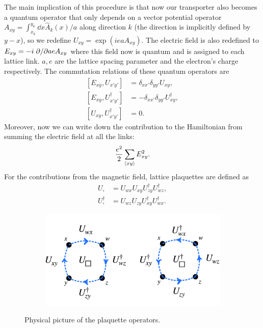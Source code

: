 \documentclass[a4paper]{report}
\begin{document}
\begin{spacing}{1.1}
The main implication of this procedure is that now our transporter also becomes a quantum operator that only depends on a vector potential operator ${A}_{xy} = \int_{x_k}^{y_k}\dd x \hat{A}_k(x)/a$ along direction $k$ (the direction is implicitly defined by $y-x$), so we redefine $U_{xy} = \exp( iea A_{xy} )$. The electric field is also redefined to $E_{xy} = -i \pdv*{aeA_{xy}}$ where this field now is quantum and is assigned to each lattice link. $a,e$ are the lattice spacing parameter and the electron's charge respectively. The commutation relations of these quantum operators are
\begin{align} 
    \left[ E_{xy}, U_{x'y'} \right] &= \delta_{xx'}\delta_{yy'}U_{xy}, \label{eq:comEU}\\ 
    \left[ E_{xy}, U^\dagger_{x'y'} \right] &= -\delta_{xx'}\delta_{yy'}U^\dagger_{xy}, \label{eq:comEUt}\\
    \left[U_{xy},U^\dagger_{x'y'}\right] &= 0. \label{eq:comUU}
\end{align}
Moreover, now we can write down the contribution to the Hamiltonian from summing the electric field at all the links:
\begin{equation}
    \frac{e^2}{2} \sum_{\expval{xy}} E^2_{xy}.
\end{equation}
For the contributions from the magnetic field, lattice plaquettes are defined as
\begin{align}
    U_\square &= U_{wx}U_{xy}U^\dagger_{zy}U^\dagger_{wz}, \\
    U^\dagger_\square &= U_{wz}U_{zy}U^\dagger_{xy}U^\dagger_{wx}.
\end{align}
\vspace*{-1cm}
\begin{figure}[h!]
\centering
\begin{subfigure}{0.4\textwidth}
\includegraphics[width=\linewidth]{Usquare.png} %
\end{subfigure}
\caption{Physical picture of the plaquette operators.\label{fig:Usq}}
\end{figure}


\end{spacing}
\end{document}

